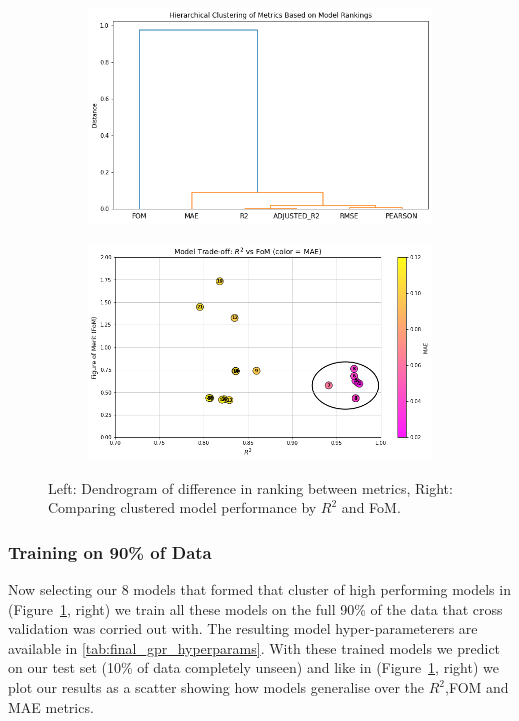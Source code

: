 \documentclass[11pt]{article}
\begin{document}
\begin{figure}[H]
    \centering
    \begin{subfigure}[t]{0.3\textwidth}
        \centering
        \includegraphics[width=\textwidth]{LatexPlots/CV_plots/clustermetrics.png}
    \end{subfigure}
    \hspace{0.03\textwidth}
    \begin{subfigure}[t]{0.3\textwidth}
        \centering
        \includegraphics[width=\textwidth]{LatexPlots/CV_plots/r2vsfom.png}
    \end{subfigure}
    \caption{Left: Dendrogram of difference in ranking between metrics, Right: Comparing clustered model performance by $R^2$ and FoM.}
    \label{fig:CV_sidebyside}
\end{figure}





\subsubsection*{Training on 90\% of Data}
Now selecting our 8 models that formed that cluster of high performing models in (Figure~\ref{fig:CV_sidebyside}, right) we train all these models on the full 90\% of the data that cross validation was corried out with.
The resulting model hyper-parameterers are available in \ref{tab:final_gpr_hyperparams}. With these trained models we predict on our test set (10\% of data completely unseen) and like in (Figure~\ref{fig:CV_sidebyside}, right)
we plot our results as a scatter showing how models generalise over the \(R^2\),FOM and MAE metrics.
\end{document}
